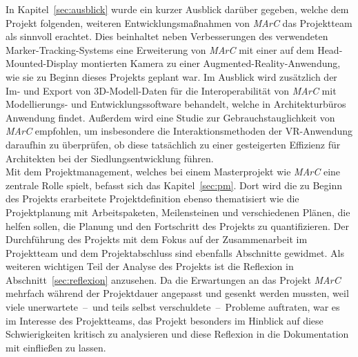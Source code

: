 In Kapitel~\ref{sec:ausblick} wurde ein kurzer Ausblick darüber gegeben, welche dem Projekt folgenden, weiteren Entwicklungsmaßnahmen von \emph{MArC} das Projektteam als sinnvoll erachtet. Dies beinhaltet neben Verbesserungen des verwendeten Marker-Tracking-Systems eine Erweiterung von \emph{MArC} mit einer auf dem Head-Mounted-Display montierten Kamera zu einer Augmented-Reality-Anwendung, wie sie zu Beginn dieses Projekts geplant war. Im Ausblick wird zusätzlich der Im- und Export von 3D-Modell-Daten für die Interoperabilität von \emph{MArC} mit Modellierungs- und Entwicklungssoftware behandelt, welche in Architekturbüros Anwendung findet. Außerdem wird eine Studie zur Gebrauchstauglichkeit von \emph{MArC} empfohlen, um insbesondere die Interaktionsmethoden der VR-Anwendung daraufhin zu überprüfen, ob diese tatsächlich zu einer gesteigerten Effizienz für Architekten bei der Siedlungsentwicklung führen.\\
Mit dem Projektmanagement, welches bei einem Masterprojekt wie \emph{MArC} eine zentrale Rolle spielt, befasst sich das Kapitel~\ref{sec:pm}. Dort wird die zu Beginn des Projekts erarbeitete Projektdefinition ebenso thematisiert wie die Projektplanung mit Arbeitspaketen, Meilensteinen und verschiedenen Plänen, die helfen sollen, die Planung und den Fortschritt des Projekts zu quantifizieren. Der Durchführung des Projekts mit dem Fokus auf der Zusammenarbeit im Projektteam und dem Projektabschluss sind ebenfalls Abschnitte gewidmet. Als weiteren wichtigen Teil der Analyse des Projekts ist die Reflexion in Abschnitt~\ref{sec:reflexion} anzusehen. Da die Erwartungen an das Projekt \emph{MArC} mehrfach während der Projektdauer angepasst und gesenkt werden mussten, weil viele unerwartete~--~und teils selbst verschuldete~--~Probleme auftraten, war es im Interesse des Projektteams, das Projekt besonders im Hinblick auf diese Schwierigkeiten kritisch zu analysieren und diese Reflexion in die Dokumentation mit einfließen zu lassen.
